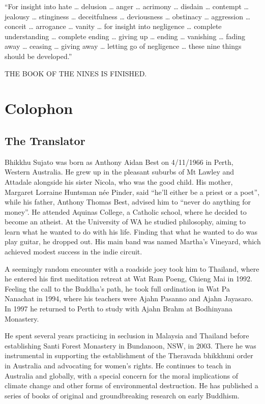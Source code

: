 \documentclass[12pt,openany]{book}%
\newcommand*{\scendbook}[1]{\bigskip\begin{Center}\uppercase{#1}\end{Center}\addvspace{1em}}
\let\oldbackmatter\backmatter
\renewcommand{\backmatter}{%
\chapterfont{\setstretch{.85}\normalfont\centering}%
\sectionfont{\setstretch{.85}\normalfont\BalancedRagged}%
\pagestyle{plainer}%
\oldbackmatter}
\begin{document}
“For insight into hate … delusion … anger … acrimony … disdain … contempt … jealousy … stinginess … deceitfulness … deviousness … obstinacy … aggression … conceit … arrogance … vanity … for insight into negligence … complete understanding … complete ending … giving up … ending … vanishing … fading away … ceasing … giving away … letting go of negligence … these nine things should be developed.” 

\scendbook{The Book of the Nines is finished. }

%
\backmatter%
\chapter*{Colophon}

\section*{The Translator}

Bhikkhu Sujato was born as Anthony Aidan Best on 4/11/1966 in Perth, Western Australia. He grew up in the pleasant suburbs of Mt Lawley and Attadale alongside his sister Nicola, who was the good child. His mother, Margaret Lorraine Huntsman née Pinder, said “he’ll either be a priest or a poet”, while his father, Anthony Thomas Best, advised him to “never do anything for money”. He attended Aquinas College, a Catholic school, where he decided to become an atheist. At the University of WA he studied philosophy, aiming to learn what he wanted to do with his life. Finding that what he wanted to do was play guitar, he dropped out. His main band was named Martha’s Vineyard, which achieved modest success in the indie circuit. 

A seemingly random encounter with a roadside joey took him to Thailand, where he entered his first meditation retreat at Wat Ram Poeng, Chieng Mai in 1992. Feeling the call to the Buddha’s path, he took full ordination in Wat Pa Nanachat in 1994, where his teachers were Ajahn Pasanno and Ajahn Jayasaro. In 1997 he returned to Perth to study with Ajahn Brahm at Bodhinyana Monastery. 

He spent several years practicing in seclusion in Malaysia and Thailand before establishing Santi Forest Monastery in Bundanoon, NSW, in 2003. There he was instrumental in supporting the establishment of the Theravada bhikkhuni order in Australia and advocating for women’s rights. He continues to teach in Australia and globally, with a special concern for the moral implications of climate change and other forms of environmental destruction. He has published a series of books of original and groundbreaking research on early Buddhism. 
\end{document}
